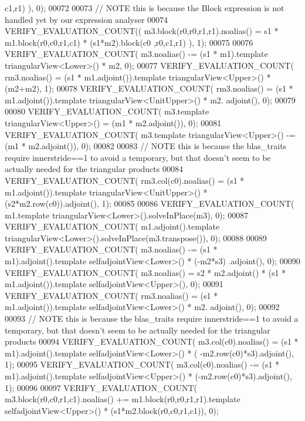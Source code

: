 \begin{DoxyCode}
      c1,r1) ), 0);
00072 
00073   \textcolor{comment}{// NOTE this is because the Block expression is not handled yet by our expression analyser}
00074   VERIFY\_EVALUATION\_COUNT(( m3.block(r0,r0,r1,r1).noalias() = s1 * m1.block(r0,c0,r1,c1) * (s1*m2).block(c0
      ,r0,c1,r1) ), 1);
00075 
00076   VERIFY\_EVALUATION\_COUNT( m3.noalias() -= (s1 * m1).\textcolor{keyword}{template} triangularView<Lower>() * m2, 0);
00077   VERIFY\_EVALUATION\_COUNT( rm3.noalias() = (s1 * m1.adjoint()).\textcolor{keyword}{template} triangularView<Upper>() * (m2+m2), 
      1);
00078   VERIFY\_EVALUATION\_COUNT( rm3.noalias() = (s1 * m1.adjoint()).\textcolor{keyword}{template} triangularView<UnitUpper>() * m2.
      adjoint(), 0);
00079 
00080   VERIFY\_EVALUATION\_COUNT( m3.template triangularView<Upper>() = (m1 * m2.adjoint()), 0);
00081   VERIFY\_EVALUATION\_COUNT( m3.template triangularView<Upper>() -= (m1 * m2.adjoint()), 0);
00082 
00083   \textcolor{comment}{// NOTE this is because the blas\_traits require innerstride==1 to avoid a temporary, but that doesn't
       seem to be actually needed for the triangular products}
00084   VERIFY\_EVALUATION\_COUNT( rm3.col(c0).noalias() = (s1 * m1.adjoint()).\textcolor{keyword}{template} triangularView<UnitUpper>()
       * (s2*m2.row(c0)).adjoint(), 1);
00085 
00086   VERIFY\_EVALUATION\_COUNT( m1.template triangularView<Lower>().solveInPlace(m3), 0);
00087   VERIFY\_EVALUATION\_COUNT( m1.adjoint().template triangularView<Lower>().solveInPlace(m3.transpose()), 0);
00088 
00089   VERIFY\_EVALUATION\_COUNT( m3.noalias() -= (s1 * m1).adjoint().template selfadjointView<Lower>() * (-m2*s3)
      .adjoint(), 0);
00090   VERIFY\_EVALUATION\_COUNT( m3.noalias() = s2 * m2.adjoint() * (s1 * m1.adjoint()).\textcolor{keyword}{template} 
      selfadjointView<Upper>(), 0);
00091   VERIFY\_EVALUATION\_COUNT( rm3.noalias() = (s1 * m1.adjoint()).\textcolor{keyword}{template} selfadjointView<Lower>() * m2.
      adjoint(), 0);
00092 
00093   \textcolor{comment}{// NOTE this is because the blas\_traits require innerstride==1 to avoid a temporary, but that doesn't
       seem to be actually needed for the triangular products}
00094   VERIFY\_EVALUATION\_COUNT( m3.col(c0).noalias() = (s1 * m1).adjoint().template selfadjointView<Lower>() * (
      -m2.row(c0)*s3).adjoint(), 1);
00095   VERIFY\_EVALUATION\_COUNT( m3.col(c0).noalias() -= (s1 * m1).adjoint().template selfadjointView<Upper>() * 
      (-m2.row(c0)*s3).adjoint(), 1);
00096 
00097   VERIFY\_EVALUATION\_COUNT( m3.block(r0,c0,r1,c1).noalias() += m1.block(r0,r0,r1,r1).template 
      selfadjointView<Upper>() * (s1*m2.block(r0,c0,r1,c1)), 0);

\end{DoxyCode}
